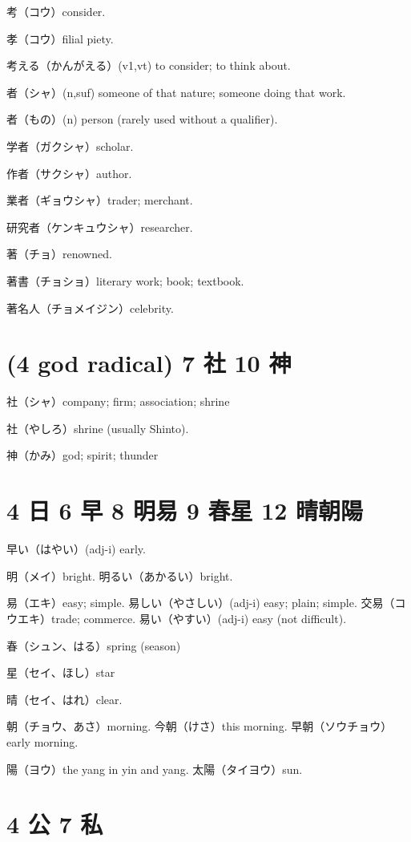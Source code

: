 考（コウ）consider.

孝（コウ）filial piety.

考える（かんがえる）(v1,vt) to consider; to think about.

者（シャ）(n,suf) someone of that nature; someone doing that work.

者（もの）(n) person (rarely used without a qualifier).

学者（ガクシャ）scholar.

作者（サクシャ）author.

業者（ギョウシャ）trader; merchant.

研究者（ケンキュウシャ）researcher.

著（チョ）renowned.

著書（チョショ）literary work; book; textbook.

著名人（チョメイジン）celebrity.

\section{(4 god radical) 7 社 10 神}

社（シャ）company; firm; association; shrine

社（やしろ）shrine (usually Shinto).

神（かみ）god; spirit; thunder

\section{4 日 6 早 8 明易 9 春星 12 晴朝陽}

早い（はやい）(adj-i) early.

明（メイ）bright.
明るい（あかるい）bright.

易（エキ）easy; simple.
易しい（やさしい）(adj-i) easy; plain; simple.
交易（コウエキ）trade; commerce.
易い（やすい）(adj-i) easy (not difficult).

春（シュン、はる）spring (season)

星（セイ、ほし）star

晴（セイ、はれ）clear.

朝（チョウ、あさ）morning.
今朝（けさ）this morning.
早朝（ソウチョウ）early morning.

陽（ヨウ）the yang in yin and yang.
太陽（タイヨウ）sun.

\section{4 公 7 私}

